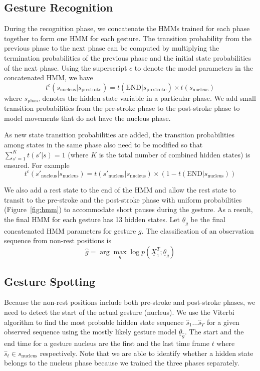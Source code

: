 \documentclass{sig-alternate-2013}
\begin{document}
\subsection{Gesture Recognition}
During the recognition phase, we concatenate the HMMs trained for each phase together to form
one HMM for each gesture. The transition probability from the previous phase to the next
phase can be computed by multiplying the termination probabilities of the previous phase and the
initial state probabilities of the next phase. Using the superscript $c$ to denote the model
parameters in the concatenated HMM, we have
\begin{displaymath}
t^c(s_\text{nucleus}|s_\text{prestroke}) = t(\text{END}|s_\text{prestroke}) \times t(s_\text{nucleus})
\end{displaymath}
where $s_{\text{phase}}$ denotes the hidden state variable in a particular phase. We add small transition
probabilities from the pre-stroke phase to the post-stroke phase to model movements that do not have the 
nucleus phase.

As new state transition probabilities are added, the transition probabilities among
states in the same phase also need to be modified so that $\sum_{s' = 1}^K t(s'|s) = 1$ (where
$K$ is the total number of combined hidden states) is ensured. For example
\begin{displaymath}
t^c(s'_{\text{nucleus}} | s_{\text{nucleus}}) = t(s'_{\text{nucleus}} | s_{\text{nucleus}})
  \times (1 - t(\text{END} | s_{\text{nucleus}}))
\end{displaymath}

We also add a rest state to the end of the HMM and allow the rest state to transit to the pre-stroke
and the post-stroke phase with uniform probabilities (Figure~\ref{fig:hmm}) to accommodate short pauses during the gesture.
As a result, the final HMM for each gesture has 13 hidden states.
Let $\underline{\theta}_g$ be the final concatenated HMM parameters for gesture $g$. The classification
of an observation sequence from non-rest positions is 
\begin{displaymath}
\hat{g} = \arg\max_g\log p(\underline{X}_1^T; \underline{\theta}_g)
\end{displaymath}

\subsection{Gesture Spotting}
Because the non-rest positions include both pre-stroke and post-stroke phases, we need
to detect the start of the actual gesture (nucleus). We use the Viterbi algorithm
to find the most probable hidden state sequence $\hat{s}_1\ldots\hat{s}_T$ for a given observed sequence using 
the mostly likely gesture model $\underline{\theta}_{\hat{g}}$. The start and the end time for a gesture nucleus are
the first and the last time frame $t$ where $\hat{s}_t\in s_{\text{nucleus}}$ respectively. Note that
we are able to identify whether a hidden state belongs to the nucleus phase because we trained the three phases
separately.
\end{document}
